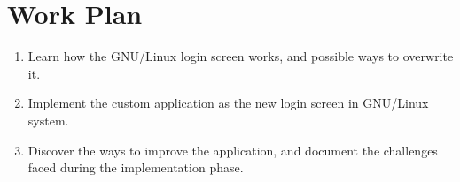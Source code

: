 \section{Work Plan}
\begin{enumerate}
  \item Learn how the GNU/Linux login screen works, and possible ways to overwrite it.
  \item Implement the custom application as the new login screen in GNU/Linux system.
  \item Discover the ways to improve the application, and document the challenges
        faced during the implementation phase.
\end{enumerate}
